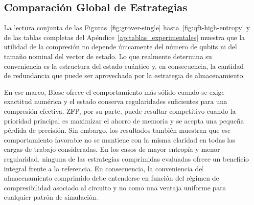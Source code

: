 \subsection{Comparación Global de Estrategias}

La lectura conjunta de las Figuras~\ref{fig:grover-single}
hasta~\ref{fig:qft-high-entropy} y de las tablas completas del
Apéndice~\ref{ap:tablas_experimentales} muestra que la utilidad de la
compresión no depende únicamente del número de qubits ni del tamaño nominal del
vector de estado. Lo que realmente determina su conveniencia es la estructura
del estado cuántico y, en consecuencia, la cantidad de redundancia que puede ser
aprovechada por la estrategia de almacenamiento.

En ese marco, Blosc ofrece el comportamiento más sólido cuando se exige
exactitud numérica y el estado conserva regularidades suficientes para una
compresión efectiva. ZFP, por su parte, puede resultar competitivo cuando la
prioridad principal es maximizar el ahorro de memoria y se acepta una pequeña
pérdida de precisión. Sin embargo, los resultados también muestran que ese
comportamiento favorable no se mantiene con la misma claridad en todas las
cargas de trabajo consideradas. En los casos de mayor entropía y menor
regularidad, ninguna de las estrategias comprimidas evaluadas ofrece un
beneficio integral frente a la referencia. En consecuencia, la conveniencia del
almacenamiento comprimido debe entenderse en función del régimen de
compresibilidad asociado al circuito y no como una ventaja uniforme para
cualquier patrón de simulación.